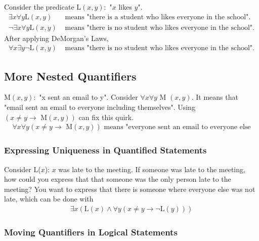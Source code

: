\noindent Consider the predicate L\((x,y):\) "\(x\) likes \(y\)".
\begin{align*}
  \exists x \forall y \text{L}(x, y)       & \text{ means "there is a student who likes everyone in the school".}  \\
  \lnot \exists x \forall y \text{L}(x, y) & \text{ means "there is no student who likes everyone in the school".}
\end{align*}
After applying DeMorgan's Laws,
\begin{align*}
  \forall x \exists y \lnot \text{L}(x, y) & \text{ means "there is no student who likes everyone in the school".}
\end{align*}

\subsection{More Nested Quantifiers}

M\((x, y):\) "x sent an email to y". Consider \(\forall x \forall y\) M \((x, y)\).
It means that "email sent an email to everyone including themselves".
Using \(( x \not = y \rightarrow \text{ M}(x, y))\) can fix this quirk.
\begin{align*}
  \forall x \forall y (x \not = y \rightarrow \text{ M}(x, y))
  \text{ means "everyone sent an email to everyone else}
\end{align*}

\subsubsection{Expressing Uniqueness in Quantified Statements}

Consider L($x$): $x$ was late to the meeting. If someone was late to the meeting,
how could you express that that someone was the only person late to the meeting?
You want to express that there is someone where everyone else was not late, which
can be done with
\begin{align*}
  \exists x (\text{L}(x) \land \forall y (x \not = y \rightarrow \lnot \text{L}(y)))
\end{align*}

\subsubsection{Moving Quantifiers in Logical Statements}

